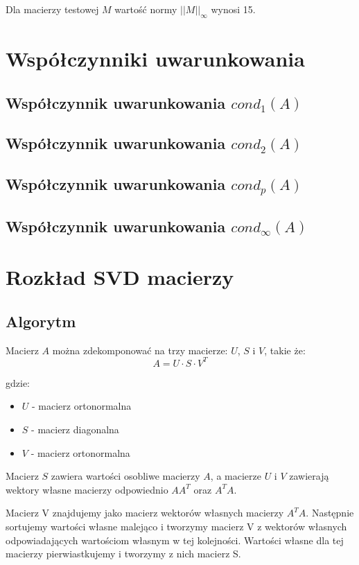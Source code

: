 \documentclass[a4paper]{article}
\begin{document}
Dla macierzy testowej $M$ wartość normy $||M||_{\infty}$ wynosi 15.


\section{Współczynniki uwarunkowania}

\subsection{Współczynnik uwarunkowania $cond_1(A)$}

\subsection{Współczynnik uwarunkowania $cond_2(A)$}

\subsection{Współczynnik uwarunkowania $cond_p(A)$}

\subsection{Współczynnik uwarunkowania $cond_{\infty}(A)$}

\section{Rozkład SVD macierzy}

\subsection{Algorytm}

Macierz \(A\) można zdekomponować na trzy macierze: \(U\), \(S\) i \(V\), takie że:
\[
    A = U \cdot S \cdot V^T
\]

gdzie:
\begin{itemize}
    \item \(U\) - macierz ortonormalna
    \item \(S\) - macierz diagonalna
    \item \(V\) - macierz ortonormalna
\end{itemize}

Macierz \(S\) zawiera wartości osobliwe macierzy \(A\), a macierze \(U\) i \(V\)
zawierają wektory własne macierzy odpowiednio $A A^T $ oraz $A^T  A$.

Macierz V znajdujemy jako macierz wektorów własnych macierzy \(A^T A\).
Następnie sortujemy wartości własne malejąco i tworzymy macierz V z wektorów własnych
odpowiadających wartościom własnym w tej kolejności. Wartości własne dla tej macierzy
pierwiastkujemy i tworzymy z nich macierz S.
\end{document}
